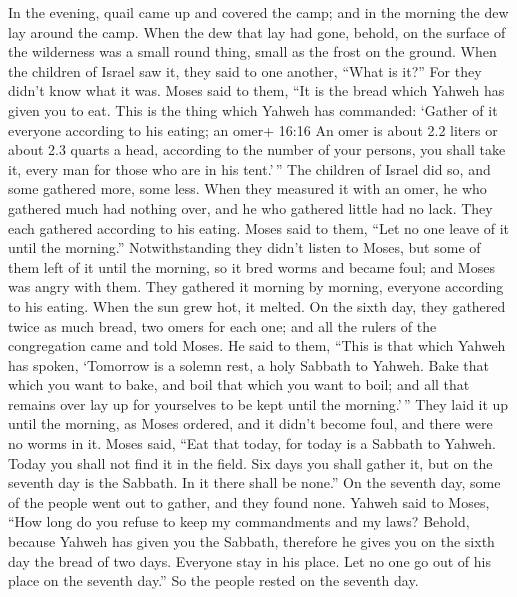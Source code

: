  In the evening, quail came up and covered the camp; and in
the morning the dew lay around the camp.  When the dew that
lay had gone, behold, on the surface of the wilderness was a small round
thing, small as the frost on the ground.  When the children
of Israel saw it, they said to one another, ``What is it?'' For they
didn't know what it was. Moses said to them, ``It is the bread which
Yahweh has given you to eat.  This is the thing which
Yahweh has commanded: `Gather of it everyone according to his eating; an
omer+ 16:16 An omer is about 2.2 liters or about 2.3 quarts a head,
according to the number of your persons, you shall take it, every man
for those who are in his tent.'\,''  The children of Israel
did so, and some gathered more, some less.  When they
measured it with an omer, he who gathered much had nothing over, and he
who gathered little had no lack. They each gathered according to his
eating.  Moses said to them, ``Let no one leave of it until
the morning.''  Notwithstanding they didn't listen to
Moses, but some of them left of it until the morning, so it bred worms
and became foul; and Moses was angry with them.  They
gathered it morning by morning, everyone according to his eating. When
the sun grew hot, it melted.  On the sixth day, they
gathered twice as much bread, two omers for each one; and all the rulers
of the congregation came and told Moses.  He said to them,
``This is that which Yahweh has spoken, `Tomorrow is a solemn rest, a
holy Sabbath to Yahweh. Bake that which you want to bake, and boil that
which you want to boil; and all that remains over lay up for yourselves
to be kept until the morning.'\,''  They laid it up until
the morning, as Moses ordered, and it didn't become foul, and there were
no worms in it.  Moses said, ``Eat that today, for today is
a Sabbath to Yahweh. Today you shall not find it in the field.
 Six days you shall gather it, but on the seventh day is
the Sabbath. In it there shall be none.''  On the seventh
day, some of the people went out to gather, and they found none.
 Yahweh said to Moses, ``How long do you refuse to keep my
commandments and my laws?  Behold, because Yahweh has given
you the Sabbath, therefore he gives you on the sixth day the bread of
two days. Everyone stay in his place. Let no one go out of his place on
the seventh day.''  So the people rested on the seventh
day.


